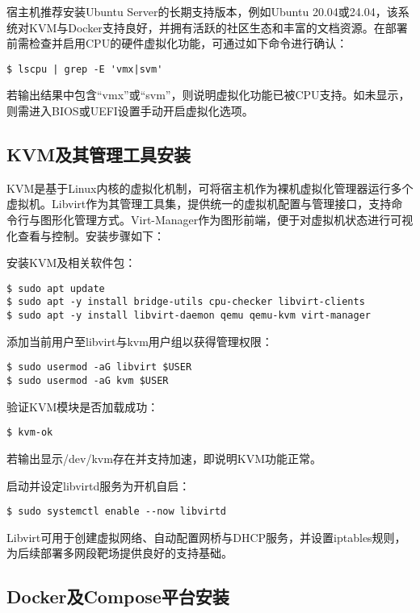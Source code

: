 \documentclass[lang=cn,10pt]{elegantbook}
\begin{document}
宿主机推荐安装Ubuntu Server的长期支持版本，例如Ubuntu 20.04或24.04，该系统对KVM与Docker支持良好，并拥有活跃的社区生态和丰富的文档资源。在部署前需检查并启用CPU的硬件虚拟化功能，可通过如下命令进行确认：


\begin{verbatim}
$ lscpu | grep -E 'vmx|svm'
\end{verbatim}

若输出结果中包含“vmx”或“svm”，则说明虚拟化功能已被CPU支持。如未显示，则需进入BIOS或UEFI设置手动开启虚拟化选项。

\subsection{KVM及其管理工具安装}

KVM是基于Linux内核的虚拟化机制，可将宿主机作为裸机虚拟化管理器运行多个虚拟机。Libvirt作为其管理工具集，提供统一的虚拟机配置与管理接口，支持命令行与图形化管理方式。Virt-Manager作为图形前端，便于对虚拟机状态进行可视化查看与控制。安装步骤如下：

安装KVM及相关软件包：

\begin{verbatim}
$ sudo apt update
$ sudo apt -y install bridge-utils cpu-checker libvirt-clients 
$ sudo apt -y install libvirt-daemon qemu qemu-kvm virt-manager
\end{verbatim}

添加当前用户至libvirt与kvm用户组以获得管理权限：

\begin{verbatim}
$ sudo usermod -aG libvirt $USER
$ sudo usermod -aG kvm $USER
\end{verbatim}

验证KVM模块是否加载成功：

\begin{verbatim}
$ kvm-ok
\end{verbatim}

若输出显示/dev/kvm存在并支持加速，即说明KVM功能正常。

启动并设定libvirtd服务为开机自启：

\begin{verbatim}
$ sudo systemctl enable --now libvirtd
\end{verbatim}

Libvirt可用于创建虚拟网络、自动配置网桥与DHCP服务，并设置iptables规则，为后续部署多网段靶场提供良好的支持基础。

\subsection{Docker及Compose平台安装}
\end{document}
